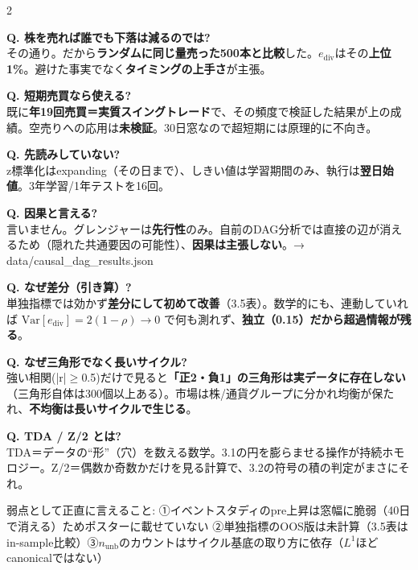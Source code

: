 \documentclass[9pt,a4paper]{article}
\newcommand{\ediv}{e_{\mathrm{div}}}
\newcommand{\nunb}{n_{\mathrm{unb}}}
\newcommand{\qa}[2]{{\color{accent}\textbf{Q. #1}}\\ #2 \par\smallskip}
\begin{document}
\begin{multicols}{2}
{\qa{株を売れば誰でも下落は減るのでは?}{その通り。だから\textbf{ランダムに同じ量売った500本と比較}した。$\ediv$はその\textbf{上位1\%}。避けた事実でなく\textbf{タイミングの上手さ}が主張。}

\qa{短期売買なら使える?}{既に\textbf{年19回売買＝実質スイングトレード}で、その頻度で検証した結果が上の成績。空売りへの応用は\textbf{未検証}。30日窓なので超短期には原理的に不向き。}

\qa{先読みしていない?}{z標準化はexpanding（その日まで）、しきい値は学習期間のみ、執行は\textbf{翌日始値}。3年学習/1年テストを16回。}

\qa{因果と言える?}{言いません。グレンジャーは\textbf{先行性}のみ。自前のDAG分析では直接の辺が消えるため（隠れた共通要因の可能性）、\textbf{因果は主張しない}。{\color{muted}→ data/causal\_dag\_results.json}}

\qa{なぜ差分（引き算）?}{単独指標では効かず\textbf{差分にして初めて改善}（3.5表）。数学的にも、連動していれば $\mathrm{Var}[\ediv]=2(1-\rho)\to0$ で何も測れず、\textbf{独立（0.15）だから超過情報が残る}。}

\qa{なぜ三角形でなく長いサイクル?}{強い相関(|r|$\geq$0.5)だけで見ると\textbf{「正2・負1」の三角形は実データに存在しない}（三角形自体は300個以上ある）。市場は株/通貨グループに分かれ均衡が保たれ、\textbf{不均衡は長いサイクルで生じる}。}

\qa{TDA / Z/2 とは?}{TDA＝データの``形''（穴）を数える数学。3.1の円を膨らませる操作が持続ホモロジー。Z/2＝偶数か奇数かだけを見る計算で、3.2の符号の積の判定がまさにそれ。}
}
\end{multicols}

\vfill
{\color{muted}\scriptsize 弱点として正直に言えること: ①イベントスタディのpre上昇は窓幅に脆弱（40日で消える）ためポスターに載せていない ②単独指標のOOS版は未計算（3.5表はin-sample比較）③$\nunb$のカウントはサイクル基底の取り方に依存（$L^1$ほどcanonicalではない）}
\end{document}
